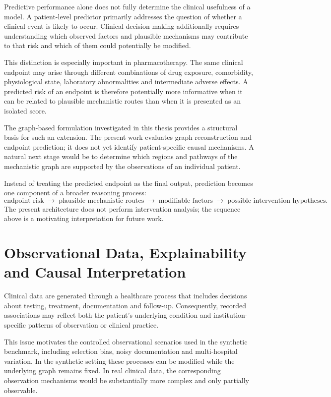 Predictive performance alone does not fully determine the clinical usefulness of a model.
A patient-level predictor primarily addresses the question of whether a clinical event is
likely to occur. Clinical decision making additionally requires understanding which observed
factors and plausible mechanisms may contribute to that risk and which of them could
potentially be modified.

This distinction is especially important in pharmacotherapy. The same clinical endpoint may
arise through different combinations of drug exposure, comorbidity, physiological state,
laboratory abnormalities and intermediate adverse effects. A predicted risk of an endpoint
is therefore potentially more informative when it can be related to plausible mechanistic
routes than when it is presented as an isolated score.

The graph-based formulation investigated in this thesis provides a structural basis for such
an extension. The present work evaluates graph reconstruction and endpoint prediction;
it does not yet identify patient-specific causal mechanisms. A natural next stage would be
to determine which regions and pathways of the mechanistic graph are supported by the
observations of an individual patient.

Instead of treating the predicted endpoint as the final
output, prediction becomes one component of a broader reasoning process:
\begin{equation}
\text{endpoint risk}
\;\rightarrow\;
\text{plausible mechanistic routes}
\;\rightarrow\;
\text{modifiable factors}
\;\rightarrow\;
\text{possible intervention hypotheses}.
\end{equation}
The present architecture does not perform intervention analysis; the sequence above is a
motivating interpretation for future work.

\section{Observational Data, Explainability and Causal Interpretation}
\label{sec:joint-observational-causal}

Clinical data are generated
through a healthcare process that includes decisions about testing, treatment,
documentation and follow-up. Consequently, recorded associations may reflect both the
patient's underlying condition and institution-specific patterns of observation or clinical
practice.

This issue motivates the controlled observational scenarios used in the synthetic benchmark,
including selection bias, noisy documentation and multi-hospital variation. In the synthetic
setting these processes can be modified while the underlying graph remains fixed. In real
clinical data, the corresponding observation mechanisms would be substantially more
complex and only partially observable.

